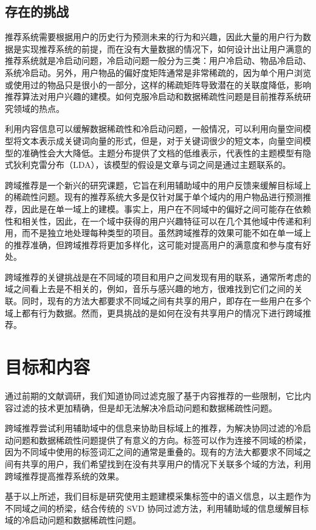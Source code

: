 \section{存在的挑战} 
推荐系统需要根据用户的历史行为预测未来的行为和兴趣，因此大量的用户行为数据是实现推荐系统的前提，而在没有大量数据的情况下，如何设计出让用户满意的推荐系统就是冷启动问题，冷启动问题一般分为三类：用户冷启动、物品冷启动、系统冷启动。另外，用户物品的偏好度矩阵通常是非常稀疏的，因为单个用户浏览或使用过的物品只是很小的一部分，这样的稀疏矩阵导致潜在的关联度降低，影响推荐算法对用户兴趣的建模。如何克服冷启动和数据稀疏性问题是目前推荐系统研究领域的热点。

利用内容信息可以缓解数据稀疏性和冷启动问题，一般情况，可以利用向量空间模型将文本表示成关键词向量的形式，但是，对于关键词很少的短文本，向量空间模型的准确性会大大降低。主题分布提供了文档的低维表示，代表性的主题模型有隐式狄利克雷分布（LDA），该模型的假设是文章与词之间是通过主题联系的。

跨域推荐是一个新兴的研究课题，它旨在利用辅助域中的用户反馈来缓解目标域上的稀疏性问题。现有的推荐系统大多是仅针对属于单个域内的用户物品进行预测推荐，因此是在单一域上的建模。事实上，用户在不同域中的偏好之间可能存在依赖性和相关性，因此，在一个域中获得的用户兴趣特征可以在几个其他域中传递和利用，而不是独立地处理每种类型的项目。虽然跨域推荐的效果可能不如在单一域上的推荐准确，但跨域推荐将更加多样化，这可能对提高用户的满意度和参与度有好处\cite{fernandez2012cross}。

跨域推荐的关键挑战是在不同域的项目和用户之间发现有用的联系，通常所考虑的域之间看上去是不相关的，例如，音乐与感兴趣的地方，很难找到它们之间的关联\cite{shi2011tags}。同时，现有的方法大都要求不同域之间有共享的用户，即存在一些用户在多个域上都有行为数据。然而，更具挑战的是如何在没有共享用户的情况下进行跨域推荐。


\chapter{目标和内容}
通过前期的文献调研，我们知道协同过滤克服了基于内容推荐的一些限制，它比内容过滤的技术更加精确，但是却无法解决冷启动问题和数据稀疏性问题。

跨域推荐尝试利用辅助域中的信息来协助目标域上的推荐，为解决协同过滤的冷启动问题和数据稀疏性问题提供了有意义的方向。标签可以作为连接不同域的桥梁，因为不同域中使用的标签词汇之间的通常是重叠的。现有的方法大都要求不同域之间有共享的用户，我们希望找到在没有共享用户的情况下关联多个域的方法，利用跨域推荐提高推荐系统的效果。


基于以上所述，我们目标是研究使用主题建模采集标签中的语义信息，以主题作为不同域之间的桥梁，结合传统的 SVD 协同过滤方法，利用辅助域的信息缓解目标域的冷启动问题和数据稀疏性问题。

